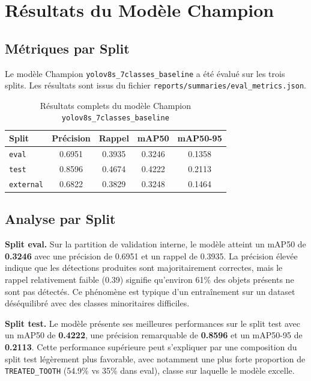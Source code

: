 \documentclass{rapportENSIAS}
\newcommand{\projectpath}[1]{\texttt{#1}}
\begin{document}
\section{Résultats du Modèle Champion}

\subsection{Métriques par Split}

Le modèle Champion \texttt{yolov8s\_7classes\_baseline} a été évalué
sur les trois splits. Les résultats sont issus du fichier
\projectpath{reports/summaries/eval\_metrics.json}.

\begin{table}[H]
\centering
\caption{Résultats complets du modèle Champion \texttt{yolov8s\_7classes\_baseline}}
\label{tab:results_baseline}
\begin{tabular}{lcccc}
\toprule
\textbf{Split} & \textbf{Précision} & \textbf{Rappel}
               & \textbf{mAP50} & \textbf{mAP50-95} \\
\midrule
\texttt{eval}     & 0.6951 & 0.3935 & 0.3246 & 0.1358 \\
\texttt{test}     & 0.8596 & 0.4674 & 0.4222 & 0.2113 \\
\texttt{external} & 0.6822 & 0.3829 & 0.3248 & 0.1464 \\
\bottomrule
\end{tabular}
\end{table}

\subsection{Analyse par Split}

\textbf{Split eval.} Sur la partition de validation interne, le modèle
atteint un mAP50 de \textbf{0.3246} avec une précision de 0.6951 et
un rappel de 0.3935. La précision élevée indique que les détections
produites sont majoritairement correctes, mais le rappel relativement
faible (0.39) signifie qu'environ 61\% des objets présents ne sont
pas détectés. Ce phénomène est typique d'un entraînement sur un dataset
déséquilibré avec des classes minoritaires difficiles.

\textbf{Split test.} Le modèle présente ses meilleures performances
sur le split test avec un mAP50 de \textbf{0.4222}, une précision
remarquable de \textbf{0.8596} et un mAP50-95 de \textbf{0.2113}.
Cette performance supérieure peut s'expliquer par une composition
du split test légèrement plus favorable, avec notamment une plus
forte proportion de \texttt{TREATED\_TOOTH} (54.9\% vs 35\% dans eval),
classe sur laquelle le modèle excelle.
\end{document}
